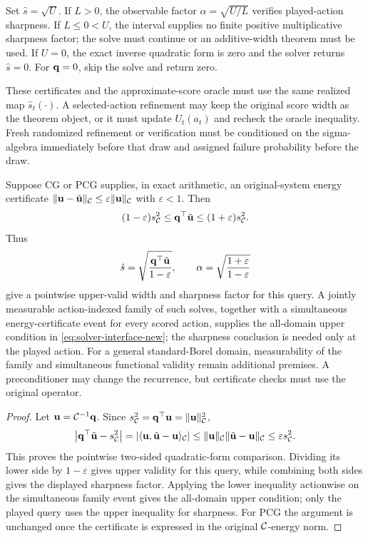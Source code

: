 Set $\hat s=\sqrt{U}$.  If $L>0$, the observable factor
$\alpha=\sqrt{U/L}$ verifies played-action sharpness.  If $L\le0<U$, the
interval supplies no finite positive multiplicative sharpness factor; the solve
must continue or an additive-width theorem must be used.  If $U=0$, the exact
inverse quadratic form is zero and the solver returns $\hat s=0$.  For
$\mathbf{q}=0$, skip the solve and return zero.

These certificates and the approximate-score oracle must use the same realized
map $\hat s_t(\cdot)$.  A selected-action refinement may keep the original score
width as the theorem object, or it must update $U_t(a_t)$ and recheck the oracle
inequality.  Fresh randomized refinement or verification must be conditioned on
the sigma-algebra immediately before that draw and assigned failure probability
before the draw.

\begin{corollary}
\label{cor:cg-interface-new}
Suppose CG or PCG supplies, in exact arithmetic, an original-system energy
certificate
$\|\mathbf{u}-\tilde{\mathbf{u}}\|_{\mathcal{C}}\le\varepsilon\|\mathbf{u}\|_{\mathcal{C}}$ with
$\varepsilon<1$.  Then
\[
 (1-\varepsilon)s_{\mathcal{C}}^2
 \le\mathbf{q}^\top\tilde{\mathbf{u}}
 \le(1+\varepsilon)s_{\mathcal{C}}^2.
\]
Thus
\[
 \hat s=\sqrt{\frac{\mathbf{q}^\top\tilde{\mathbf{u}}}{1-\varepsilon}},
 \qquad
 \alpha=\sqrt{\frac{1+\varepsilon}{1-\varepsilon}}
\]
give a pointwise upper-valid width and sharpness factor for this query.  A
jointly measurable action-indexed family of such solves, together with a
simultaneous energy-certificate event for every scored action, supplies the
all-domain upper condition in \eqref{eq:solver-interface-new}; the sharpness
conclusion is needed only at the played action.  For a general standard-Borel
domain, measurability of the family and simultaneous functional validity remain
additional premises.  A preconditioner may change the recurrence, but
certificate checks must use the original operator.
\end{corollary}
\begin{proof}
Let $\mathbf{u}=\mathcal{C}^{-1}\mathbf{q}$.  Since
$s_{\mathcal{C}}^2=\mathbf{q}^\top\mathbf{u}=\|\mathbf{u}\|_{\mathcal{C}}^2$,
\[
 \left|\mathbf{q}^\top\tilde{\mathbf{u}}-s_{\mathcal{C}}^2\right|
 =\left|\langle\mathbf{u},\tilde{\mathbf{u}}-\mathbf{u}\rangle_{\mathcal{C}}\right|
 \le\|\mathbf{u}\|_{\mathcal{C}}\|\tilde{\mathbf{u}}-\mathbf{u}\|_{\mathcal{C}}
 \le\varepsilon s_{\mathcal{C}}^2.
\]
This proves the pointwise two-sided quadratic-form comparison.  Dividing its
lower side by $1-\varepsilon$ gives upper validity for this query, while
combining both sides gives the displayed sharpness factor.  Applying the lower
inequality actionwise on the simultaneous family event gives the all-domain
upper condition; only the played query uses the upper inequality for
sharpness.  For PCG the argument is unchanged once the certificate is expressed
in the original $\mathcal{C}$-energy norm.
\end{proof}

